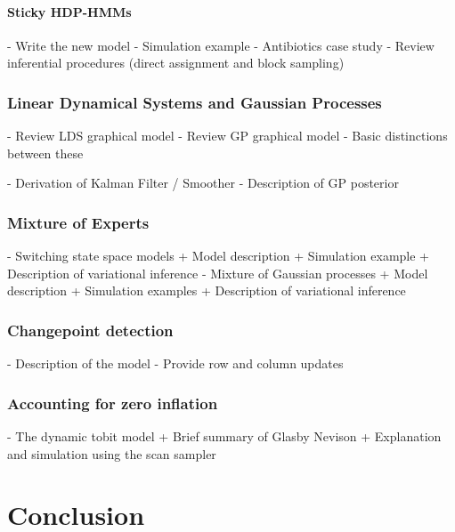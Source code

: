 \documentclass{report}
\begin{document}
\subsubsection{Sticky HDP-HMMs}

- Write the new model
- Simulation example
- Antibiotics case study
- Review inferential procedures (direct assignment and block sampling)

\subsection{Linear Dynamical Systems and Gaussian Processes}

- Review LDS graphical model
- Review GP graphical model
- Basic distinctions between these

- Derivation of Kalman Filter / Smoother
- Description of GP posterior

\subsection{Mixture of Experts}

- Switching state space models
   + Model description
   + Simulation example
   + Description of variational inference
- Mixture of Gaussian processes
  + Model description
  + Simulation examples
  + Description of variational inference

\subsection{Changepoint detection}

- Description of the model
- Provide row and column updates

\subsection{Accounting for zero inflation}

- The dynamic tobit model
  + Brief summary of Glasby Nevison
  + Explanation and simulation using the scan sampler

\chapter{Conclusion}



\end{document}
